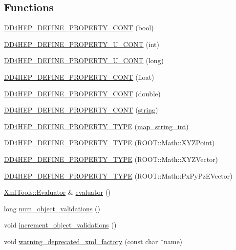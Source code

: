 \subsection*{Functions}
\begin{DoxyCompactItemize}
\item 
\hyperlink{namespace_d_d4hep_a2a12fc15eee252853c7dae0c8c10289c}{DD4HEP\_\-DEFINE\_\-PROPERTY\_\-CONT} (bool)
\item 
\hyperlink{namespace_d_d4hep_a46bcfee20ed1f70d5d76b01a58a17a6d}{DD4HEP\_\-DEFINE\_\-PROPERTY\_\-U\_\-CONT} (int)
\item 
\hyperlink{namespace_d_d4hep_a67e8fcf00713a100e27262956cfd4531}{DD4HEP\_\-DEFINE\_\-PROPERTY\_\-U\_\-CONT} (long)
\item 
\hyperlink{namespace_d_d4hep_ae9ef794f55e34dba969074941408b572}{DD4HEP\_\-DEFINE\_\-PROPERTY\_\-CONT} (float)
\item 
\hyperlink{namespace_d_d4hep_ad408fcdf0daa5ec52a5a1dbfbf211eb4}{DD4HEP\_\-DEFINE\_\-PROPERTY\_\-CONT} (double)
\item 
\hyperlink{namespace_d_d4hep_ab33d2c119234589fde3ac44efa5d2fbc}{DD4HEP\_\-DEFINE\_\-PROPERTY\_\-CONT} (\hyperlink{classstd_1_1string}{string})
\item 
\hyperlink{namespace_d_d4hep_ade11f09970354c220f7e06750e6612f1}{DD4HEP\_\-DEFINE\_\-PROPERTY\_\-TYPE} (\hyperlink{namespace_d_d4hep_a5d68f9c863a419d5ed00cc08b473e352}{map\_\-string\_\-int})
\item 
\hyperlink{namespace_d_d4hep_a622b20d2110955cfac58aee38d3d2f62}{DD4HEP\_\-DEFINE\_\-PROPERTY\_\-TYPE} (ROOT::Math::XYZPoint)
\item 
\hyperlink{namespace_d_d4hep_a837feac073c4437c1df965f9a8fb768e}{DD4HEP\_\-DEFINE\_\-PROPERTY\_\-TYPE} (ROOT::Math::XYZVector)
\item 
\hyperlink{namespace_d_d4hep_a8b032fe993ba835daea31abfe2fa1d19}{DD4HEP\_\-DEFINE\_\-PROPERTY\_\-TYPE} (ROOT::Math::PxPyPzEVector)
\item 
\hyperlink{class_xml_tools_1_1_evaluator}{XmlTools::Evaluator} \& \hyperlink{namespace_d_d4hep_a5a6983dcc5d95a8aad6910ad842f0b6e}{evaluator} ()
\item 
long \hyperlink{namespace_d_d4hep_a022862a49c9bd20d654f90dbcb88c14f}{num\_\-object\_\-validations} ()
\item 
void \hyperlink{namespace_d_d4hep_a74a35c08bae34ad9a479a1726eafab98}{increment\_\-object\_\-validations} ()
\item 
void \hyperlink{namespace_d_d4hep_a1726e0eed52fa5804e004e72e8c73775}{warning\_\-deprecated\_\-xml\_\-factory} (const char $\ast$name)

\end{DoxyCompactItemize}
